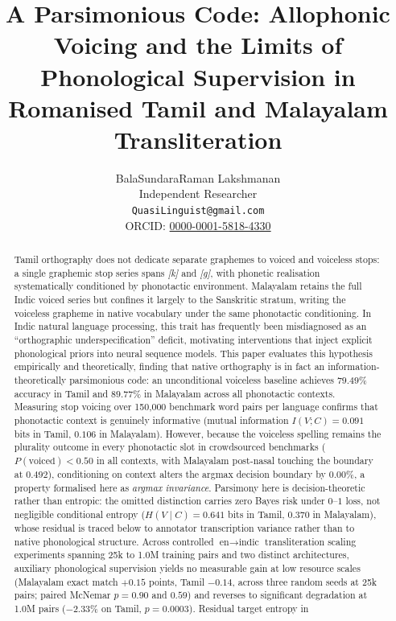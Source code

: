 \documentclass[11pt]{article}
\title{A Parsimonious Code: Allophonic Voicing and the Limits of\\
Phonological Supervision in Romanised Tamil and Malayalam Transliteration}
\author{BalaSundaraRaman Lakshmanan\\
  Independent Researcher\\
  \texttt{QuasiLinguist@gmail.com}\\
  ORCID: \href{https://orcid.org/0000-0001-5818-4330}{0000-0001-5818-4330}}
\date{}
\begin{document}
\maketitle

\begin{abstract}
Tamil orthography does not dedicate separate graphemes to voiced and voiceless stops: a
single graphemic stop series spans \textit{[k]} and \textit{[g]}, with phonetic realisation
systematically conditioned by phonotactic environment. Malayalam retains the full Indic
voiced series but confines it largely to the Sanskritic stratum, writing the voiceless
grapheme in native vocabulary under the same phonotactic conditioning. In Indic natural language
processing, this trait has frequently been misdiagnosed as an ``orthographic
underspecification'' deficit, motivating interventions that inject explicit phonological priors
into neural sequence models. This paper evaluates this hypothesis empirically and theoretically, finding
that native orthography is in fact an information-theoretically parsimonious code: an
unconditional voiceless baseline achieves $79.49\%$ accuracy in Tamil and $89.77\%$ in
Malayalam across all phonotactic contexts. Measuring stop voicing over 150{,}000 benchmark word
pairs per language confirms that phonotactic context is genuinely informative (mutual
information $I(V;C) = 0.091$ bits in Tamil, $0.106$ in Malayalam). However, because the
voiceless spelling remains the plurality outcome in every phonotactic slot in crowdsourced
benchmarks ($P(\text{voiced}) < 0.50$ in all contexts, with Malayalam post-nasal touching the boundary at $0.492$), conditioning on context alters the
argmax decision boundary by $0.00\%$, a property formalised here as \emph{argmax invariance}. Parsimony here is decision-theoretic rather than entropic: the omitted distinction carries
zero Bayes risk under $0$--$1$ loss, not negligible conditional entropy ($H(V\mid C) = 0.641$
bits in Tamil, $0.370$ in Malayalam), whose residual is traced below to annotator transcription
variance rather than to native phonological structure.
Across controlled $\text{en}\rightarrow\text{indic}$ transliteration scaling experiments spanning 25k to 1.0M training pairs and two
distinct architectures, auxiliary phonological supervision yields no measurable gain at low resource scales
(Malayalam exact match $+0.15$ points, Tamil $-0.14$, across three random seeds at 25k pairs; paired McNemar $p = 0.90$ and $0.59$)
and reverses to significant degradation at 1.0M pairs ($-2.33\%$ on Tamil, $p = 0.0003$). Residual target entropy in

\end{abstract}
\end{document}
